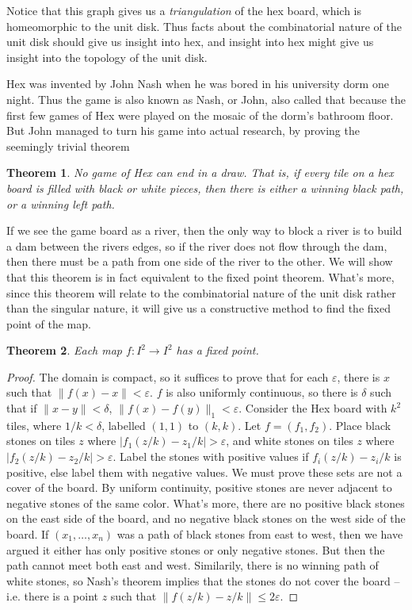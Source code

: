 \documentclass{article}
\theoremstyle{plain}
\newtheorem{theorem}{Theorem}
\begin{document}
Notice that this graph gives us a {\it triangulation} of the hex board, which is homeomorphic to the unit disk. Thus facts about the combinatorial nature of the unit disk should give us insight into hex, and insight into hex might give us insight into the topology of the unit disk.

Hex was invented by John Nash when he was bored in his university dorm one night. Thus the game is also known as Nash, or John, also called that because the first few games of Hex were played on the mosaic of the dorm's bathroom floor. But John managed to turn his game into actual research, by proving the seemingly trivial theorem

\begin{theorem}
    No game of Hex can end in a draw. That is, if every tile on a hex board is filled with black or white pieces, then there is either a winning black path, or a winning left path.
\end{theorem}

If we see the game board as a river, then the only way to block a river is to build a dam between the rivers edges, so if the river does not flow through the dam, then there must be a path from one side of the river to the other. We will show that this theorem is in fact equivalent to the fixed point theorem. What's more, since this theorem will relate to the combinatorial nature of the unit disk rather than the singular nature, it will give us a constructive method to find the fixed point of the map.

\begin{theorem}
    Each map $f: I^2 \to I^2$ has a fixed point.
\end{theorem}
\begin{proof}
    The domain is compact, so it suffices to prove that for each $\varepsilon$, there is $x$ such that $\| f(x) - x \| < \varepsilon$. $f$ is also uniformly continuous, so there is $\delta$ such that if $\| x - y \| < \delta$, $\| f(x) - f(y) \|_1 < \varepsilon$. Consider the Hex board with $k^2$ tiles, where $1/k < \delta$, labelled $(1,1)$ to $(k,k)$. Let $f = (f_1, f_2)$. Place black stones on tiles $z$ where $| f_1(z/k) - z_1/k | > \varepsilon$, and white stones on tiles $z$ where $| f_2(z/k) - z_2/k | > \varepsilon$. Label the stones with positive values if $f_i(z/k) - z_i/k$ is positive, else label them with negative values. We must prove these sets are not a cover of the board. By uniform continuity, positive stones are never adjacent to negative stones of the same color. What's more, there are no positive black stones on the east side of the board, and no negative black stones on the west side of the board. If $(x_1, \dots, x_n)$ was a path of black stones from east to west, then we have argued it either has only positive stones or only negative stones. But then the path cannot meet both east and west. Similarily, there is no winning path of white stones, so Nash's theorem implies that the stones do not cover the board -- i.e. there is a point $z$ such that $\| f(z/k) - z/k \| \leq 2 \varepsilon$.
\end{proof}
\end{document}
